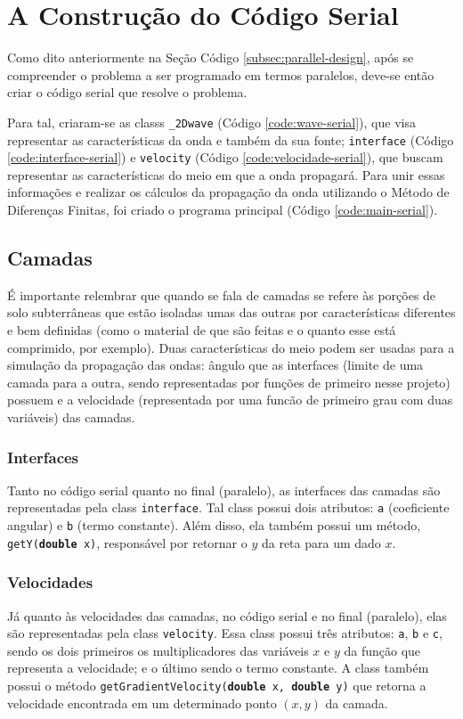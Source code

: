 \section{A Construção do Código Serial}

Como dito anteriormente na Seção Código \ref{subsec:parallel-design},
após se compreender o problema a ser programado em termos paralelos,
deve-se então criar o código serial que resolve o problema.

Para tal, criaram-se as \glspl{class} \texttt{\_2Dwave} (Código \ref{code:wave-serial}), que visa representar as características da
onda e também da sua fonte; \texttt{interface} (Código \ref{code:interface-serial}) e \texttt{velocity}
(Código \ref{code:velocidade-serial}), que buscam representar as características do meio em que a onda propagará.
Para unir essas informações e realizar os cálculos da propagação da onda utilizando o Método de Diferenças Finitas, foi
criado o programa principal (Código \ref{code:main-serial}).

\subsection{Camadas}
É importante relembrar que quando se fala de camadas se refere às porções de solo subterrâneas
que estão isoladas umas das outras por características diferentes e bem definidas (como o material
de que são feitas e o quanto esse está comprimido, por exemplo). Duas características do meio podem ser
usadas para a simulação da propagação das ondas: ângulo que as interfaces (limite de uma camada para a outra,
sendo representadas por funções de primeiro nesse projeto) possuem e a velocidade (representada por uma funcão de
primeiro grau com duas variáveis) das camadas.

\subsubsection{Interfaces}
Tanto no código serial quanto no final (paralelo), as interfaces das camadas são representadas
pela \gls{class} \texttt{interface}. Tal \gls{class} possui dois atributos: \texttt{a} (coeficiente angular) e
\texttt{b} (termo constante). Além disso, ela também possui um método, \texttt{getY(\textbf{double} x)}, responsável por retornar
o $y$ da reta para um dado $x$.

\subsubsection{Velocidades}
Já quanto às velocidades das camadas, no código serial e no final (paralelo), elas são representadas
pela \gls{class} \texttt{velocity}. Essa \gls{class} possui três atributos: \texttt{a}, \texttt{b} e \texttt{c},
sendo os dois primeiros os multiplicadores das variáveis $x$ e $y$ da função que representa a velocidade; e o último
sendo o termo constante. A \gls{class} também possui o método \texttt{getGradientVelocity(\textbf{double} x, \textbf{double} y)}
que retorna a velocidade encontrada em um determinado ponto $(x, y)$ da camada.

